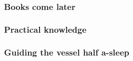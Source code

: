             \begin{quote}
                
            \end{quote}

        \subsubsection{Books come later}

            \begin{quote}
                
            \end{quote}

        \subsubsection{Practical knowledge}

            \begin{quote}
                
            \end{quote}

        \subsubsection{Guiding the vessel half a-sleep}

            \begin{quote}
                
            \end{quote}


            